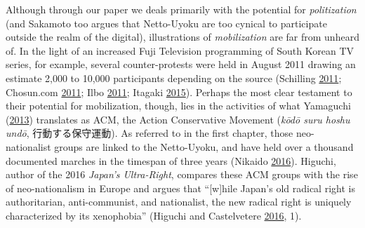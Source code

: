 \documentclass[10pt,british,A4paper,twoside]{memoir}
\begin{document}
Although through our paper we deals primarily with the potential for
\emph{politization} (and Sakamoto too argues that Netto-Uyoku are too
cynical to participate outside the realm of the digital), illustrations
of \emph{mobilization} are far from unheard of. In the light of an increased
Fuji Television programming of South Korean TV series, for example,
several counter-protests were held in August 2011 drawing an estimate
2,000 to 10,000 participants depending on the source (Schilling
\protect\hyperlink{ref-schilling_japanese_2011}{2011}; Chosun.com
\protect\hyperlink{ref-chosun.com_japanese_2011}{2011}; Ilbo
\protect\hyperlink{ref-the_donga_ilbo_japans_2011}{2011}; Itagaki
\protect\hyperlink{ref-itagaki_anatomy_2015}{2015}). Perhaps the most
clear testament to their potential for mobilization, though, lies
in the activities of what Yamaguchi
(\protect\hyperlink{ref-yamaguchi_xenophobia_2013}{2013}) translates as
ACM, the Action Conservative Movement (\emph{kōdō suru hoshu undō},
行動する保守運動). As referred to in the first chapter, those
neo-nationalist groups are linked to the Netto-Uyoku, and have held over
a thousand documented marches in the timespan of three years (Nikaido
\protect\hyperlink{ref-nikaido_eng:_2016}{2016}). Higuchi, author of the
2016 \emph{Japan's Ultra-Right}, compares these ACM groups with the rise
of neo-nationalism in Europe and argues that ``{[}w{]}hile Japan's old
radical right is authoritarian, anti-communist, and nationalist, the new
radical right is uniquely characterized by its xenophobia'' (Higuchi and
Castelvetere \protect\hyperlink{ref-higuchi_japans_2016}{2016}, 1).
\end{document}
